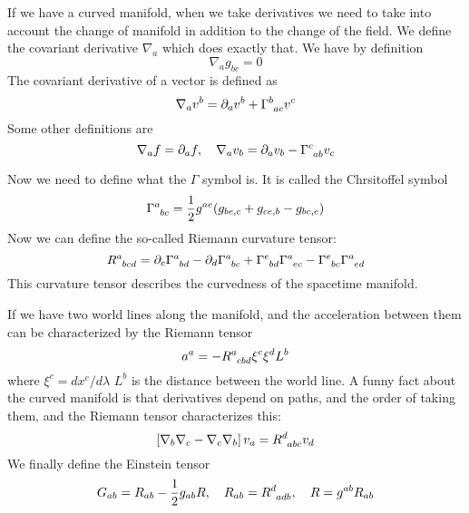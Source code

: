 \documentclass[letterpaper, 11pt]{article}
\numberwithin{equation}{section}
\numberwithin{figure}{section}
\begin{document}
If we have a curved manifold, when we take derivatives we need to take into
account the change of manifold in addition to the change of the field. We define
the covariant derivative $\nabla_{a}$ which does exactly that. We have by definition
\begin{equation}
  \label{eq:8}
  \nabla_ag_{bc} = 0
\end{equation}
The covariant derivative of a vector is defined as
\begin{equation}
  \label{eq:9}
  \nabla_av^b = \partial_av^{b} + \tensor{\Gamma}{^{b}_{ac}}v^{c}
\end{equation}
Some other definitions are
\begin{equation}
  \label{eq:10}
  \nabla_a f = \partial_{a}f,\quad \nabla_av_{b} = \partial_av_{b} - \tensor{\Gamma}{^{c}_{ab}}v_{c}
\end{equation}

Now we need to define what the $\Gamma$ symbol is. It is called the Chrsitoffel
symbol
\begin{equation}
  \label{eq:11}
  \tensor{\Gamma}{^{a}_{bc}} = \frac{1}{2}g^{ae}(g_{be,c} + g_{ce,b} - g_{bc,e})
\end{equation}
Now we can define the so-called Riemann curvature tensor:
\begin{equation}
  \label{eq:12}
  \tensor{R}{^a_{bcd}} = \partial_{c}\tensor{\Gamma}{^a_{bd}} - \partial_{d}\tensor{\Gamma}{^a_{bc}} + \tensor{\Gamma}{^{e}_{bd}}\tensor{\Gamma}{^{a}_{ec}} - \tensor{\Gamma}{^{e}_{bc}}\tensor{\Gamma}{^{a}_{ed}}
\end{equation}
This curvature tensor describes the curvedness of the spacetime manifold.

If we have two world lines along the manifold, and the acceleration between them
can be characterized by the Riemann tensor
\begin{equation}
  \label{eq:13}
  a^a = -\tensor{R}{^{a}_{cbd}}\xi^{c}\xi^dL^{b}
\end{equation}
where $\xi^{c} = dx^{c}/d\lambda$ $L^{b}$ is the distance between the world
line. A funny fact about the curved manifold is that derivatives depend on
paths, and the order of taking them, and the Riemann tensor characterizes this:
\begin{equation}
  \label{eq:14}
  \left[ \nabla_{b}\nabla_{c} - \nabla_{c}\nabla_{b} \right] v_{a} = \tensor{R}{^{d}_{abc}}v_{d}
\end{equation}
We finally define the Einstein tensor
\begin{equation}
  \label{eq:15}
  G_{ab} = R_{ab} - \frac{1}{2}g_{ab}R,\quad R_{ab} = \tensor{R}{^{d}_{adb}},\quad R = g^{ab}R_{ab}
\end{equation}
\end{document}
